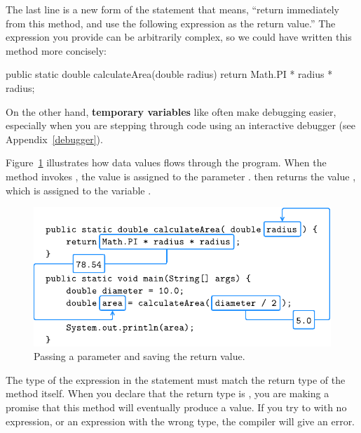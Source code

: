 The last line is a new form of the  statement that means, ``return immediately from this method, and use the following expression as the return value.''
The expression you provide can be arbitrarily complex, so we could have written this method more concisely:

\begin{code}
public static double calculateArea(double radius) {
    return Math.PI * radius * radius;
}
\end{code}


On the other hand, {\bf temporary variables} like  often make debugging easier, especially when you are stepping through code using an interactive debugger (see Appendix~\ref{debugger}).

Figure~\ref{fig.param} illustrates how data values flows through the program.
When the  method invokes , the value  is assigned to the parameter .
 then returns the value , which is assigned to the variable .

\begin{figure}[!ht]
\begin{center}
\includegraphics{figs/param.pdf}
\caption{Passing a parameter and saving the return value.}
\label{fig.param}
\end{center}
\end{figure}

The type of the expression in the  statement must match the return type of the method itself.
When you declare that the return type is , you are making a promise that this method will eventually produce a  value.
If you try to  with no expression, or  an expression with the wrong type, the compiler will give an error.


